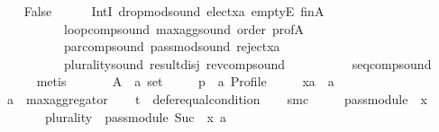 \begin{isabellebody}
\ \ \isamarkupfalse%
\ {\isachardoublequoteopen}False{\isachardoublequoteclose}\isanewline
\ \ \ \ \isamarkupfalse%
\ IntI\ drop{\isacharunderscore}{\kern0pt}mod{\isacharunderscore}{\kern0pt}sound\ elect{\isacharunderscore}{\kern0pt}xa\ emptyE\ fin{\isacharunderscore}{\kern0pt}A\isanewline
\ \ \ \ \ \ \ \ \ \ loop{\isacharunderscore}{\kern0pt}comp{\isacharunderscore}{\kern0pt}sound\ max{\isacharunderscore}{\kern0pt}agg{\isacharunderscore}{\kern0pt}sound\ order\ prof{\isacharunderscore}{\kern0pt}A\isanewline
\ \ \ \ \ \ \ \ \ \ par{\isacharunderscore}{\kern0pt}comp{\isacharunderscore}{\kern0pt}sound\ pass{\isacharunderscore}{\kern0pt}mod{\isacharunderscore}{\kern0pt}sound\ reject{\isacharunderscore}{\kern0pt}xa\isanewline
\ \ \ \ \ \ \ \ \ \ plurality{\isacharunderscore}{\kern0pt}sound\ result{\isacharunderscore}{\kern0pt}disj\ rev{\isacharunderscore}{\kern0pt}comp{\isacharunderscore}{\kern0pt}sound\isanewline
\ \ \ \ \ \ \ \ \ \ seq{\isacharunderscore}{\kern0pt}comp{\isacharunderscore}{\kern0pt}sound\isanewline
\ \ \ \ \isamarkupfalse%
\ metis\isanewline
{}\isamarkupfalse%
\isanewline
\ \ \isamarkupfalse%
\isanewline
\ \ \ \ A\ {\isacharcolon}{\kern0pt}{\isacharcolon}{\kern0pt}\ {\isachardoublequoteopen}{\isacharprime}{\kern0pt}a\ set{\isachardoublequoteclose}\ \isanewline
\ \ \ \ p\ {\isacharcolon}{\kern0pt}{\isacharcolon}{\kern0pt}\ {\isachardoublequoteopen}{\isacharprime}{\kern0pt}a\ Profile{\isachardoublequoteclose}\ \isanewline
\ \ \ \ xa\ {\isacharcolon}{\kern0pt}{\isacharcolon}{\kern0pt}\ {\isachardoublequoteopen}{\isacharprime}{\kern0pt}a{\isachardoublequoteclose}\isanewline
\ \ \isamarkupfalse%
\ {\isacharquery}{\kern0pt}a\ {\isacharequal}{\kern0pt}\ {\isachardoublequoteopen}max{\isacharunderscore}{\kern0pt}aggregator{\isachardoublequoteclose}\isanewline
\ \ \isamarkupfalse%
\ {\isacharquery}{\kern0pt}t\ {\isacharequal}{\kern0pt}\ {\isachardoublequoteopen}defer{\isacharunderscore}{\kern0pt}equal{\isacharunderscore}{\kern0pt}condition{\isachardoublequoteclose}\isanewline
\ \ \isamarkupfalse%
\ {\isacharquery}{\kern0pt}smc\ {\isacharequal}{\kern0pt}\isanewline
\ \ \ \ {\isachardoublequoteopen}pass{\isacharunderscore}{\kern0pt}module\ {}\ x\ {\isasymtriangleright}\isanewline
\ \ \ \ \ \ \ {\isacharparenleft}{\kern0pt}{\isacharparenleft}{\kern0pt}plurality{\isasymdown}{\isacharparenright}{\kern0pt}\ {\isasymtriangleright}\ pass{\isacharunderscore}{\kern0pt}module\ {\isacharparenleft}{\kern0pt}Suc\ {}{\isacharparenright}{\kern0pt}\ x{\isacharparenright}{\kern0pt}\ {\isasymparallel}\isactrlsub {\isacharquery}{\kern0pt}a\isanewline

\end{isabellebody}
